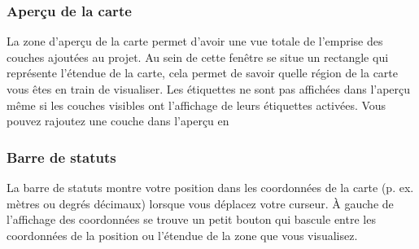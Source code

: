 \subsubsection{Aper\c{c}u de la carte}\label{label_mapoverview}

La zone d'aper\c{c}u de la carte permet d'avoir une vue totale de l'emprise des couches ajout\'ees au projet. Au sein de cette fen\^etre se situe un rectangle qui repr\'esente l'\'etendue de la carte, cela permet de savoir quelle r\'egion de la carte vous \^etes en train de visualiser. Les \'etiquettes ne sont pas affich\'ees dans l'aper\c{c}u m\^eme si les couches visibles ont l'affichage de leurs \'etiquettes activ\'ees.
Vous pouvez rajoutez une couche dans l'aper\c{c}u en

%
%
%

\subsubsection{Barre de statuts}\label{label_statusbar}

La barre de statuts montre votre position dans les coordonn\'ees de la carte (p. ex. m\`etres ou degr\'es d\'ecimaux) lorsque vous d\'eplacez votre curseur. \`A gauche de l'affichage des coordonn\'ees se trouve un petit bouton qui bascule entre les coordonn\'ees de la position ou l'\'etendue de la zone que vous visualisez.

